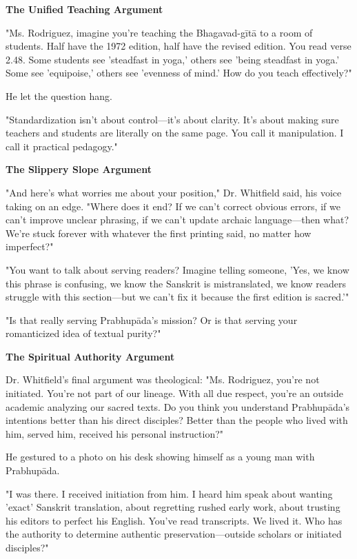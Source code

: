 \documentclass[12pt,twoside]{book}
\begin{document}
\textbf{\textbf{The Unified Teaching Argument}}

"Ms. Rodriguez, imagine you're teaching the Bhagavad-gītā to a room of students. Half have the 1972 edition, half have the revised edition. You read verse 2.48. Some students see 'steadfast in yoga,' others see 'being steadfast in yoga.' Some see 'equipoise,' others see 'evenness of mind.' How do you teach effectively?"

He let the question hang.

"Standardization isn't about control—it's about clarity. It's about making sure teachers and students are literally on the same page. You call it manipulation. I call it practical pedagogy."

\textbf{\textbf{The Slippery Slope Argument}}

"And here's what worries me about your position," Dr. Whitfield said, his voice taking on an edge. "Where does it end? If we can't correct obvious errors, if we can't improve unclear phrasing, if we can't update archaic language—then what? We're stuck forever with whatever the first printing said, no matter how imperfect?"

"You want to talk about serving readers? Imagine telling someone, 'Yes, we know this phrase is confusing, we know the Sanskrit is mistranslated, we know readers struggle with this section—but we can't fix it because the first edition is sacred.'"

"Is that really serving Prabhupāda's mission? Or is that serving your romanticized idea of textual purity?"

\textbf{\textbf{The Spiritual Authority Argument}}

Dr. Whitfield's final argument was theological: "Ms. Rodriguez, you're not initiated. You're not part of our lineage. With all due respect, you're an outside academic analyzing our sacred texts. Do you think you understand Prabhupāda's intentions better than his direct disciples? Better than the people who lived with him, served him, received his personal instruction?"

He gestured to a photo on his desk showing himself as a young man with Prabhupāda.

"I was there. I received initiation from him. I heard him speak about wanting 'exact' Sanskrit translation, about regretting rushed early work, about trusting his editors to perfect his English. You've read transcripts. We lived it. Who has the authority to determine authentic preservation—outside scholars or initiated disciples?"
\end{document}
